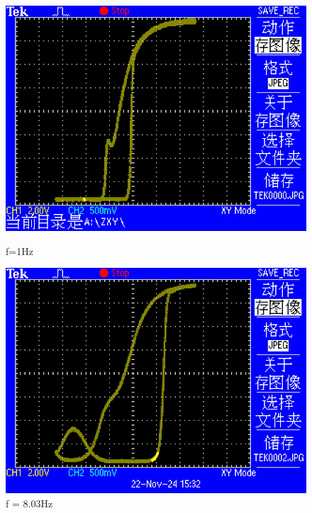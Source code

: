 \documentclass[12pt,a4paper]{article}
\begin{document}
\begin{figure}[htbp] \label{fig:响应曲线示意图}
\centering
\begin{minipage}[b]{0.22\textwidth}
    \centering
    \includegraphics[width=\textwidth]{XY/TEK0000.JPG}
    \caption{f=1Hz}
\end{minipage}
\hfill
\begin{minipage}[b]{0.22\textwidth}
    \centering
    \includegraphics[width=\textwidth]{XY/TEK0002.JPG}
    \caption{f = 8.03Hz}
\end{minipage}
\hfill
\begin{minipage}[b]{0.22\textwidth}
    \centering

\end{minipage}
\end{figure}
\end{document}
